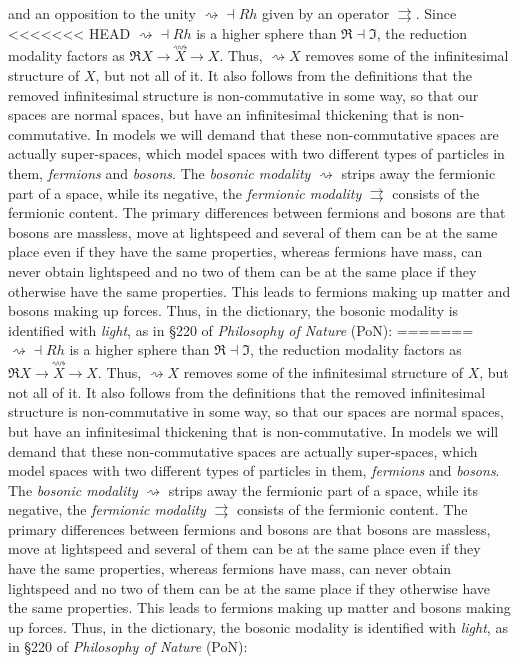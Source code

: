 \documentclass{article}
\begin{document}
and an opposition to the unity $\rightsquigarrow\dashv Rh$ given by an operator $\rightrightarrows$. Since
<<<<<<< HEAD
$\rightsquigarrow\dashv Rh$ is a higher sphere than $\Re\dashv\Im$, the reduction modality factors as $\Re
X\rightarrow\overset{\rightsquigarrow }{X}\rightarrow X$. Thus, $\rightsquigarrow X$ removes some of the
infinitesimal structure of $X$, but not all of it. It also follows from the definitions that the removed
infinitesimal structure is non-commutative in some way, so that our spaces are normal spaces, but have an
infinitesimal thickening that is non-commutative. In models we will demand that these non-commutative spaces
are actually super-spaces, which model spaces with two different types of particles in them, \emph{fermions}
and \emph{bosons}. The \emph{bosonic modality} $\rightsquigarrow$ strips away the fermionic part of a space,
while its negative, the \emph{fermionic modality} $\rightrightarrows$ consists of the fermionic content. The
primary differences between fermions and bosons are that bosons are massless, move at lightspeed and several
of them can be at the same place even if they have the same properties, whereas fermions have mass, can never
obtain lightspeed and no two of them can be at the same place if they otherwise have the same properties.
This leads to fermions making up matter and bosons making up forces. Thus, in the dictionary, the bosonic
modality is identified with \emph{light}, as in §220 of \emph{Philosophy of Nature} (PoN)\cite{EoS}:
=======
$\rightsquigarrow\dashv Rh$ is a higher sphere than $\Re\dashv\Im$, the reduction modality factors as
$\Re X\rightarrow\overset{\rightsquigarrow }{X}\rightarrow X$. Thus, $\rightsquigarrow X$ removes some
of the infinitesimal structure of $X$, but not all of it. It also follows from the definitions that the
removed infinitesimal structure is non-commutative in some way, so that our spaces are normal spaces,
but have an infinitesimal thickening that is non-commutative. In models we will demand that these non-commutative
spaces are actually super-spaces, which model spaces with two different types of particles in them, \emph{fermions}
and \emph{bosons}. The \emph{bosonic modality} $\rightsquigarrow$ strips away the fermionic part of a
space, while its negative, the \emph{fermionic modality} $\rightrightarrows$ consists of the fermionic
content. The primary differences between fermions and bosons are that bosons are massless, move at lightspeed
and several of them can be at the same place even if they have the same properties, whereas fermions have
mass, can never obtain lightspeed and no two of them can be at the same place if they otherwise have the
same properties. This leads to fermions making up matter and bosons making up forces. Thus, in the dictionary,
the bosonic modality is identified with \emph{light}, as in §220 of \emph{Philosophy of Nature} (PoN)\cite{EoS}:
\end{document}
